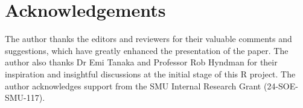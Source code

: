 \section{Acknowledgements}\label{acknowledgements}

The author thanks the editors and reviewers for their valuable comments and suggestions, which have greatly enhanced the presentation of the paper. The author also thanks Dr Emi Tanaka and Professor Rob Hyndman for their inspiration and insightful discussions at the initial stage of this R project. The author acknowledges support from the SMU Internal Research Grant (24-SOE-SMU-117).



\address{%
Jackie Li\\
School of Economics, Singapore Management University\\%
\\
%
%
%
\href{mailto:jackieli@smu.edu.sg}{\nolinkurl{jackieli@smu.edu.sg}}%
}
